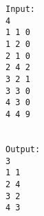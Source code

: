 \begin{verbatim}
Input:
4
1 1 0
1 2 0
2 1 0
2 4 2
3 2 1
3 3 0
4 3 0
4 4 9


Output:
3
1 1
2 4
3 2
4 3

\end{verbatim}